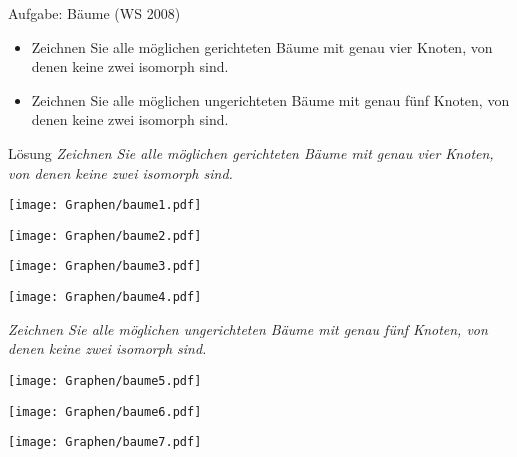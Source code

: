 \begin{frame}{Aufgabe: Bäume (WS 2008)}
	\begin{itemize}	
		\item Zeichnen Sie alle möglichen gerichteten Bäume mit genau vier Knoten, von denen keine zwei isomorph sind.
		\item Zeichnen Sie alle möglichen ungerichteten Bäume mit genau fünf Knoten, von denen keine zwei isomorph sind.
	\end{itemize}
\end{frame}

\begin{frame}{Lösung}
	\textit{Zeichnen Sie alle möglichen gerichteten Bäume mit genau vier Knoten, von denen keine zwei isomorph sind.} \pause
	\begin{center}
		\begin{minipage}{0.3\linewidth}
			\vspace*{\fill}
			\centering
			\texttt{[image: Graphen/baume1.pdf]} 
			\vfill
		\end{minipage}
		\begin{minipage}{0.2\linewidth}
			\vspace*{\fill}
			\centering
			\texttt{[image: Graphen/baume2.pdf]} 
			\vfill
		\end{minipage}
		\begin{minipage}{0.2\linewidth}
			\vspace*{\fill}
			\centering
			\texttt{[image: Graphen/baume3.pdf]} 
			\vfill
		\end{minipage}
		\begin{minipage}{0.2\linewidth}
			\vspace*{\fill}
			\centering
			\texttt{[image: Graphen/baume4.pdf]} 
			\vfill
		\end{minipage}
	\end{center} \pause
	\textit{Zeichnen Sie alle möglichen ungerichteten Bäume mit genau fünf Knoten, von denen keine zwei isomorph sind.} \pause
	\begin{center}
		\begin{minipage}{0.2\linewidth}
			\vspace*{\fill}
			\centering
			\texttt{[image: Graphen/baume5.pdf]} 
			\vfill
		\end{minipage}
		\begin{minipage}{0.25\linewidth}
			\vspace*{\fill}
			\centering
			\texttt{[image: Graphen/baume6.pdf]} 
			\vfill
		\end{minipage}
		\begin{minipage}{0.35\linewidth}
			\vspace*{\fill}
			\centering
			\texttt{[image: Graphen/baume7.pdf]} 
			\vfill
		\end{minipage}
	\end{center}
\end{frame}


